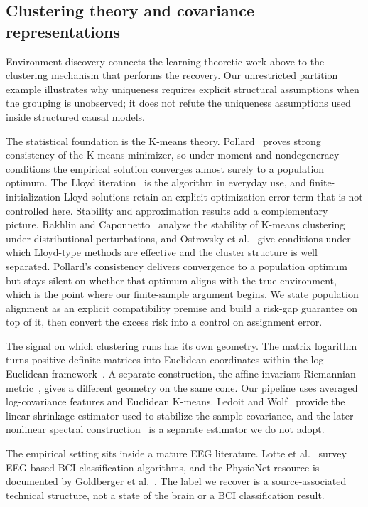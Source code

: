 \subsection{Clustering theory and covariance
representations}\label{clustering-theory-and-covariance-representations}

Environment discovery connects the learning-theoretic work above to the
clustering mechanism that performs the recovery. Our unrestricted
partition example illustrates why uniqueness requires explicit
structural assumptions when the grouping is unobserved; it does not
refute the uniqueness assumptions used inside structured causal models.

The statistical foundation is the K-means theory.
Pollard~\cite{pollard1981} proves strong consistency of
the K-means minimizer, so under moment and nondegeneracy conditions the
empirical solution converges almost surely to a population optimum. The
Lloyd iteration~\cite{lloyd1982} is the algorithm in
everyday use, and finite-initialization Lloyd solutions retain an
explicit optimization-error term that is not controlled here. Stability
and approximation results add a complementary picture. Rakhlin and
Caponnetto~\cite{rakhlin2007} analyze the stability of
K-means clustering under distributional perturbations, and Ostrovsky et
al.~\cite{ostrovsky2012} give conditions under which
Lloyd-type methods are effective and the cluster structure is well
separated. Pollard's consistency delivers convergence to a population
optimum but stays silent on whether that optimum aligns with the true
environment, which is the point where our finite-sample argument begins.
We state population alignment as an explicit compatibility premise and
build a risk-gap guarantee on top of it, then convert the excess risk
into a control on assignment error.

The signal on which clustering runs has its own geometry. The matrix
logarithm turns positive-definite matrices into Euclidean coordinates
within the log-Euclidean framework~\cite{arsigny2007}. A
separate construction, the affine-invariant Riemannian
metric~\cite{pennec2006}, gives a different geometry on
the same cone. Our pipeline uses averaged log-covariance features and
Euclidean K-means. Ledoit and Wolf~\cite{ledoit2004}
provide the linear shrinkage estimator used to stabilize the sample
covariance, and the later nonlinear spectral
construction~\cite{ledoit2012} is a separate estimator
we do not adopt.

The empirical setting sits inside a mature EEG literature. Lotte et
al.~\cite{lotte2018} survey EEG-based BCI classification
algorithms, and the PhysioNet resource is documented by Goldberger et
al.~\cite{goldberger2000}. The label we recover is a
source-associated technical structure, not a state of the brain or a BCI
classification result.

